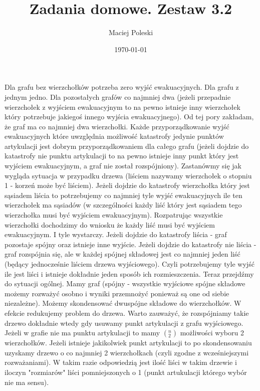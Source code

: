 \documentclass[a4paper,12pt]{article}
\title{Zadania domowe. Zestaw 3.2}
\author{Maciej Poleski}
\date{\today}
\begin{document}
\maketitle

\newpage

\section{}
Dla grafu bez wierzchołków potrzeba zero wyjść ewakuacyjnych. Dla grafu z jednym jedno. Dla pozostałych grafów co najmniej dwa (jeżeli przepadnie wierzchołek z wyjściem ewakuacyjnym to na pewno istnieje inny wierzchołek który potrzebuje jakiegoś innego wyjścia ewakuacyjnego). Od tej pory zakładam, że graf ma co najmniej dwa wierzchołki. Każde przyporządkowanie wyjść ewakuacyjnych które uwzględnia możliwość katastrofy jedynie punktów artykulacji jest dobrym przyporządkowaniem dla całego grafu (jeżeli dojdzie do katastrofy nie punktu artykulacji to na pewno istnieje inny punkt który jest wyjściem ewakuacyjnym, a graf nie został rozspójniony). Zastanówmy się jak wygląda sytuacja w przypadku drzewa (liściem nazywamy wierzchołek o stopniu 1 - korzeń może być liściem). Jeżeli dojdzie do katastrofy wierzchołka który jest sąsiadem liścia to potrzebujemy co najmniej tyle wyjść ewakuacyjnych ile ten wierzchołek ma sąsiadów (w szczególności każdy liść który jest sąsiadem tego wierzchołka musi być wyjściem ewakuacyjnym). Rozpatrując wszystkie wierzchołki dochodzimy do wniosku że każdy liść musi być wyjściem ewakuacyjnym. I tyle wystarczy. Jeżeli dojdzie do katastrofy liścia - graf pozostaje spójny oraz istnieje inne wyjście. Jeżeli dojdzie do katastrofy nie liścia - graf rozspójnia się, ale w każdej spójnej składowej jest co najmniej jeden liść (będący jednocześnie liściem drzewa wyjściowego). Czyli potrzebujemy tyle wyjść ile jest liści i istnieje dokładnie jeden sposób ich rozmieszczenia. Teraz przejdźmy do sytuacji ogólnej. Mamy graf (spójny - wszystkie wyjściowe spójne składowe możemy rozważyć osobno i wyniki przemnożyć ponieważ są one od siebie niezależne). Możemy skondensować dwuspójne składowe do wierzchołków. W efekcie redukujemy problem do drzewa. Warto zauważyć, że rozspójniamy takie drzewo dokładnie wtedy gdy usuwamy punkt artykulacji z grafu wyjściowego. Jeżeli w grafie nie ma punktu artykulacji to mamy $(^n_2)$ możliwości wyboru 2 wierzchołków. Jeżeli istnieje jakikolwiek punkt artykulacji to po skondensowaniu uzyskamy drzewo o co najmniej 2 wierzchołkach (czyli zgodne z wcześniejszymi rozważaniami). W takim razie odpowiedzią jest ilość liści w takim drzewie i iloczyn "rozmiarów" liści pomniejszonych o 1 (punkt artukulacji którego wybór nie ma sensu).
\end{document}
